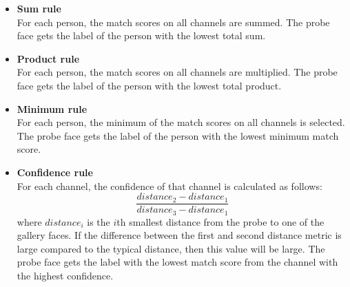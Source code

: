 \documentclass[]{article}
\begin{document}

\begin{itemize}
	\item \textbf{Sum rule}\\For each person, the match scores on all channels are summed. The probe face gets the label of the person with the lowest total sum.
	\item \textbf{Product rule}\\For each person, the match scores on all channels are multiplied. The probe face gets the label of the person with the lowest total product. 
	\item \textbf{Minimum rule}\\For each person, the minimum of the match scores on all channels is selected. The probe face gets the label of the person with the lowest minimum match score.
	\item \textbf{Confidence rule}\\ For each channel, the confidence of that channel is calculated as follows:
	\[\frac{distance_2 - distance_1}{distance_3 - distance_1}\] where $distance_i$ is the $i$th smallest distance from the probe to one of the gallery faces. If the difference between the first and second distance metric is large compared to the typical distance, then this value will be large.
	The probe face gets the label with the lowest match score from the channel with the highest confidence.
\end{itemize}
\end{document}
